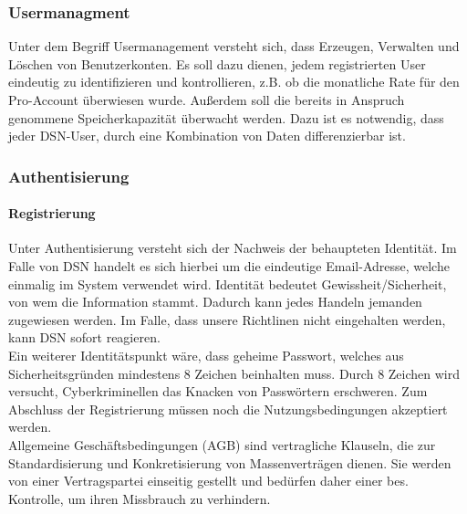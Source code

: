 
\subsubsection{Usermanagment}
Unter dem Begriff Usermanagement versteht sich, dass Erzeugen, Verwalten und Löschen von Benutzerkonten. Es soll dazu dienen, jedem registrierten User eindeutig zu identifizieren und kontrollieren, z.B. ob die monatliche Rate für den Pro-Account überwiesen wurde. Außerdem soll die bereits in Anspruch genommene Speicherkapazität überwacht werden. Dazu ist es notwendig, dass jeder DSN-User, durch eine Kombination von Daten differenzierbar ist.
\subsubsection{Authentisierung}
\paragraph{Registrierung}
Unter Authentisierung versteht sich der Nachweis der behaupteten Identität. Im Falle von DSN handelt es sich hierbei um die eindeutige Email-Adresse, welche einmalig im System verwendet wird. Identität bedeutet Gewissheit/Sicherheit, von wem die Information stammt. Dadurch kann jedes Handeln jemanden zugewiesen werden. Im Falle, dass unsere Richtlinen nicht eingehalten werden, kann DSN sofort reagieren.\\

Ein weiterer Identitätspunkt wäre, dass geheime Passwort, welches aus Sicherheitsgründen mindestens 8 Zeichen beinhalten muss. Durch 8 Zeichen wird versucht, Cyberkriminellen das Knacken von Passwörtern erschweren. Zum Abschluss der Registrierung müssen noch die Nutzungsbedingungen akzeptiert werden.\\
\grqq{}Allgemeine Geschäftsbedingungen (AGB) sind vertragliche Klauseln, die zur Standardisierung und Konkretisierung von Massenverträgen dienen. Sie werden von einer Vertragspartei einseitig gestellt und bedürfen daher einer bes. Kontrolle, um ihren Missbrauch zu verhindern.\grqq{}\cite{AGB}\\
\cite{VERTEILTE_SYSTEME}\cite{PASSWORT_SCHUTZ}\\


